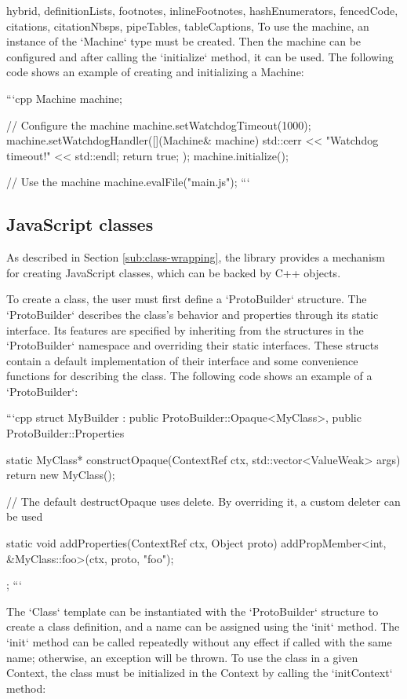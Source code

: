 \begin{markdown*}{%
  hybrid,
  definitionLists,
  footnotes,
  inlineFootnotes,
  hashEnumerators,
  fencedCode,
  citations,
  citationNbsps,
  pipeTables,
  tableCaptions,
}
To use the machine, an instance of the `Machine` type must be created. Then the machine can be configured and after calling the `initialize` method, it can be used. The following code shows an example of creating and initializing a Machine:

```cpp
Machine machine;

// Configure the machine
machine.setWatchdogTimeout(1000);
machine.setWatchdogHandler([](Machine& machine) {
  std::cerr << "Watchdog timeout!" << std::endl;
  return true;
});
machine.initialize();

// Use the machine
machine.evalFile("main.js");
```


\subsection{JavaScript classes}

As described in Section \ref{sub:class-wrapping}, the library provides a mechanism for creating JavaScript classes, which can be backed by C++ objects.

To create a class, the user must first define a `ProtoBuilder` structure. The `ProtoBuilder` describes the class's behavior and properties through its static interface. Its features are specified by inheriting from the structures in the `ProtoBuilder` namespace and overriding their static interfaces. These structs contain a default implementation of their interface and some convenience functions for describing the class. The following code shows an example of a `ProtoBuilder`:

```cpp
struct MyBuilder : public ProtoBuilder::Opaque<MyClass>, public ProtoBuilder::Properties {
  static MyClass* constructOpaque(ContextRef ctx, std::vector<ValueWeak> args) {
    return new MyClass();
  }

  // The default destructOpaque uses delete. By overriding it, a custom deleter can be used

  static void addProperties(ContextRef ctx, Object proto) {
    addPropMember<int, &MyClass::foo>(ctx, proto, "foo");
  }
};
```

The `Class` template can be instantiated with the `ProtoBuilder` structure to create a class definition, and a name can be assigned using the `init` method. The `init` method can be called repeatedly without any effect if called with the same name; otherwise, an exception will be thrown. To use the class in a given Context, the class must be initialized in the Context by calling the `initContext` method:


\end{markdown*}
